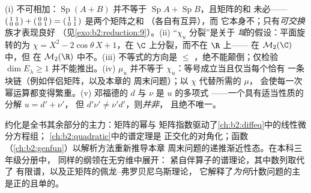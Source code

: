 \begin{remark}[常见误区]\label{rem:b2:reduction:pitfalls}
(i) 不可相加：$\operatorname{Sp}(A + B)$ 并不等于
$\operatorname{Sp}A + \operatorname{Sp}B$，且矩阵的和
未必——
$\begin{psmallmatrix}1 & 1\\ 0 & 0\end{psmallmatrix} +
\begin{psmallmatrix}0 & 0\\ 0 & 1\end{psmallmatrix} =
\begin{psmallmatrix}1 & 1\\ 0 & 1\end{psmallmatrix}$ 是两个矩阵之和
（各自有互异），而
它本身不；只有\emph{可交换}族才表现良好
（见\cref{exo:b2:reduction:9}）。(ii) “$\chi_u$ 分裂”是关于
\emph{域}的假设：平面旋转的为 $\chi =
X^2 - 2\cos\theta\,X + 1$，在 $\C$ 上分裂，而不在 $\R$ 上——
在 $\mathcal{M}_2(\C)$ 中，但
在 $\mathcal{M}_2(\R)$ 中不。(iii) 不等式的方向是 $\leq$
，绝不能颠倒；仅检验 $\dim E_\lambda \geq
1$ 并不能推出。(iv) $\mu_u$ 并不等于
$\chi_u$：等号成立当且仅当每个恰有
一条块链（例如伴侣矩阵，以及本章的
周末问题）；以 $\chi$ 代替所需的 $\mu$，
会使每一次幂运算都变得繁重。(v) 邓福德的 $d$ 与 $\nu$ 是
$u$ 的多项式 ——一个具有适当性质的分解 $u = d' + \nu'$，
但 $d'\nu' \neq \nu'd'$，则\emph{并非}，
且绝不唯一。
\end{remark}

\begin{remark}[本章的应用]
约化是全书其余部分的主力：矩阵的幂与
矩阵指数驱动了\cref{ch:b2:diffeq}中的线性微分方程组；
\cref{ch:b2:quadratic}中的谱定理是
正交化的对角化；函数
（\cref{ch:b2:genfun}）以解析方法重新推导本章
周末问题的递推渐近性态。在本科三年级分册中，
同样的纲领在无穷维中展开：
紧自伴算子的谱理论，其中数列取代了
有限谱，以及正矩阵的佩龙–弗罗贝尼乌斯理论，
它解释了\emph{为何}计数问题的主
是正的且单的。
\end{remark}

